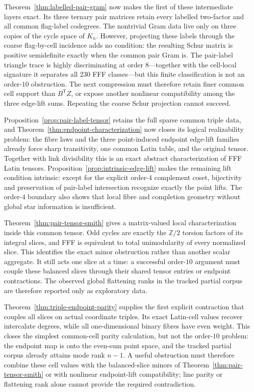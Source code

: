 Theorem~\ref{thm:labelled-pair-gram} now makes the first of these intermediate
layers exact.  Its three ternary pair matrices retain every labelled
two-factor and all common flag-label codegrees.  The nontrivial Gram data
live only on three copies of the cycle space of $K_n$.  However, projecting
these labels through the coarse flag-by-cell incidence adds no condition:
the resulting Schur matrix is positive semidefinite exactly when the common
pair Gram is.  The pair-label triangle trace is highly discriminating at
order $8$---together with the cell-local signature it separates all 230 FFF
classes---but this finite classification is not an order-$10$ obstruction.
The next compression must therefore retain finer common cell support than
$B^{\mathsf T}Z$, or expose another nonlinear compatibility among the three
edge-lift sums.  Repeating the coarse Schur projection cannot succeed.

Proposition~\ref{prop:pair-label-tensor} retains the full sparse common
triple data, and Theorem~\ref{thm:endpoint-characterization} now closes its
logical realizability problem: the fibre laws and the three point-induced
endpoint edge-lift families already force sharp transitivity, one common
Latin table, and the original tensor.  Together with link divisibility this
is an exact abstract characterization of FFF Latin tensors.
Proposition~\ref{prop:intrinsic-edge-lift} makes the remaining lift condition
intrinsic: except for the explicit order-$4$ complement coset, bijectivity
and preservation of pair-label intersection recognize exactly the point
lifts.  The order-$4$ boundary also shows that local fibre and completion
geometry without global star information is insufficient.

Theorem~\ref{thm:pair-tensor-smith} gives a matrix-valued local
characterization inside this common tensor.  Odd cycles are exactly the
$\mathbb Z/2$ torsion factors of its integral slices, and FFF is equivalent
to total unimodularity of every normalized slice.  This identifies the exact
minor obstruction rather than another scalar aggregate.  It still acts one
slice at a time: a successful order-$10$ argument must couple these balanced
slices through their shared tensor entries or endpoint contractions.  The
observed global flattening ranks in the tracked partial corpus are therefore
reported only as exploratory data.

Theorem~\ref{thm:triple-endpoint-parity} supplies the first explicit
contraction that couples all slices on actual coordinate triples.  Its exact
Latin-cell values recover intercalate degrees, while all one-dimensional
binary fibres have even weight.  This closes the simplest common-cell
parity calculation, but not the order-$10$ problem: the endpoint map is onto
the even-sum point space, and the tracked partial corpus already attains mode
rank $n-1$.  A useful obstruction must therefore combine these cell values
with the balanced-slice minors of
Theorem~\ref{thm:pair-tensor-smith} or with nonlinear endpoint-lift
compatibility; line parity or flattening rank alone cannot provide the
required contradiction.

